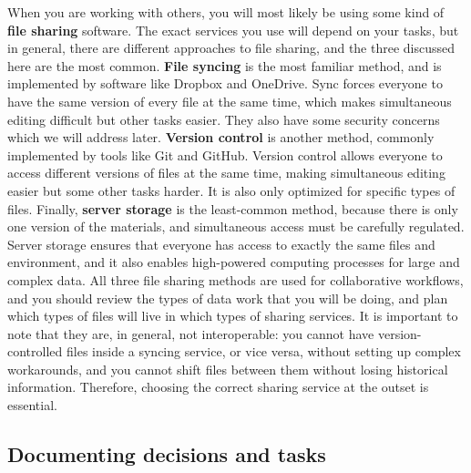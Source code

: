 When you are working with others, you will most likely be using
some kind of \textbf{file sharing} software.
The exact services you use will depend on your tasks,
but in general, there are different approaches to file sharing, and the three discussed here are the most common.
\textbf{File syncing} is the most familiar method,
and is implemented by software like Dropbox and OneDrive.
Sync forces everyone to have the same version of every file at the same time,
which makes simultaneous editing difficult but other tasks easier.
They also have some security concerns which we will address later.
\textbf{Version control} is another method,
commonly implemented by tools like Git and GitHub.
Version control allows everyone to access different versions of files at the same time,
making simultaneous editing easier but some other tasks harder.
It is also only optimized for specific types of files.
Finally, \textbf{server storage} is the least-common method,
because there is only one version of the materials,
and simultaneous access must be carefully regulated.
Server storage ensures that everyone has access
to exactly the same files and environment, and it also enables
high-powered computing processes for large and complex data.
All three file sharing methods are used for collaborative workflows,
and you should review the types of data work
that you will be doing, and plan which types of files
will live in which types of sharing services.
It is important to note that they are, in general, not interoperable:
you cannot have version-controlled files inside a syncing service,
or vice versa, without setting up complex workarounds,
and you cannot shift files between them without losing historical information.
Therefore, choosing the correct sharing service at the outset is essential.

\subsection{Documenting decisions and tasks}

